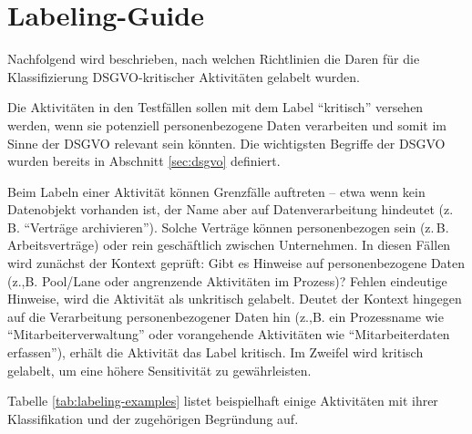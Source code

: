 \section{Labeling-Guide}\label{sec:labeling-guide}

Nachfolgend wird beschrieben, nach welchen Richtlinien die Daren für die Klassifizierung \ac{DSGVO}-kritischer Aktivitäten gelabelt wurden.

Die Aktivitäten in den Testfällen sollen mit dem Label \enquote{kritisch} versehen werden, wenn sie potenziell personenbezogene Daten verarbeiten und somit im Sinne der \ac{DSGVO} relevant sein könnten. Die wichtigsten Begriffe der \ac{DSGVO} wurden bereits in Abschnitt \ref{sec:dsgvo} definiert.

Beim Labeln einer Aktivität können Grenzfälle auftreten – etwa wenn kein Datenobjekt vorhanden ist, der Name aber auf Datenverarbeitung hindeutet (z.\,B. \enquote{Verträge archivieren}). Solche Verträge können personenbezogen sein (z.\,B. Arbeitsverträge) oder rein geschäftlich zwischen Unternehmen. In diesen Fällen wird zunächst der Kontext geprüft: Gibt es Hinweise auf personenbezogene Daten (z.,B. Pool/Lane oder angrenzende Aktivitäten im Prozess)? Fehlen eindeutige Hinweise, wird die Aktivität als unkritisch gelabelt. Deutet der Kontext hingegen auf die Verarbeitung personenbezogener Daten hin (z.,B. ein Prozessname wie \enquote{Mitarbeiterverwaltung} oder vorangehende Aktivitäten wie \enquote{Mitarbeiterdaten erfassen}), erhält die Aktivität das Label kritisch. Im Zweifel wird kritisch gelabelt, um eine höhere Sensitivität zu gewährleisten.

Tabelle \ref{tab:labeling-examples} listet beispielhaft einige Aktivitäten mit ihrer Klassifikation und der zugehörigen Begründung auf.

